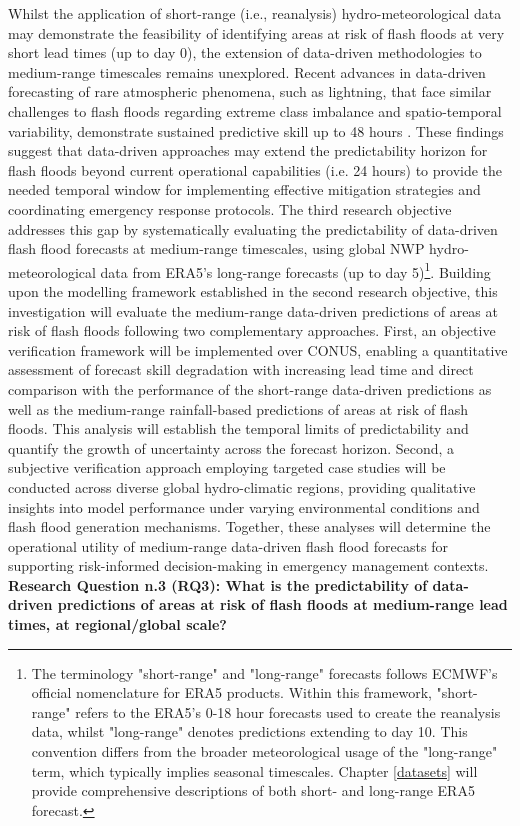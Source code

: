 Whilst  the application of short-range (i.e., reanalysis) hydro-meteorological data may demonstrate the feasibility of identifying areas at risk of flash floods at very short lead times (up to day 0), the extension of data-driven methodologies to medium-range timescales remains unexplored. Recent advances in data-driven forecasting of rare atmospheric phenomena, such as lightning, that face similar challenges to flash floods regarding extreme class imbalance and spatio-temporal variability, demonstrate sustained predictive skill up to 48 hours \citep{Cavaiola_2024}. These findings suggest that data-driven approaches may extend the predictability horizon for flash floods beyond current operational capabilities (i.e. 24 hours) to provide the needed temporal window for implementing effective mitigation strategies and coordinating emergency response protocols. The third research objective addresses this gap by systematically evaluating the predictability of data-driven flash flood forecasts at medium-range timescales, using global NWP hydro-meteorological data from ERA5's long-range forecasts (up to day 5)\footnote{The terminology "short-range" and "long-range" forecasts follows ECMWF's official nomenclature for ERA5 products. Within this framework, "short-range" refers to the ERA5's 0-18 hour forecasts used to create the reanalysis data, whilst "long-range" denotes predictions extending to day 10. This convention differs from the broader meteorological usage of the "long-range" term, which typically implies seasonal timescales. Chapter \ref{datasets} will provide comprehensive descriptions of both short- and long-range ERA5 forecast.}. Building upon the modelling framework established in the second research objective, this investigation will evaluate the medium-range data-driven predictions of areas at risk of flash floods following two complementary approaches. First, an objective verification framework will be implemented over CONUS, enabling a quantitative assessment of forecast skill degradation with increasing lead time and direct comparison with the performance of the short-range data-driven predictions as well as the medium-range rainfall-based predictions of areas at risk of flash floods. This analysis will establish the temporal limits of predictability and quantify the growth of uncertainty across the forecast horizon. Second, a subjective verification approach employing targeted case studies will be conducted across diverse global hydro-climatic regions, providing qualitative insights into model performance under varying environmental conditions and flash flood generation mechanisms. Together, these analyses will determine the operational utility of medium-range data-driven flash flood forecasts for supporting risk-informed decision-making in emergency management contexts. \textbf{Research Question n.3 (RQ3): What is the predictability of data-driven predictions of areas at risk of flash floods at medium-range lead times, at regional/global scale?}


